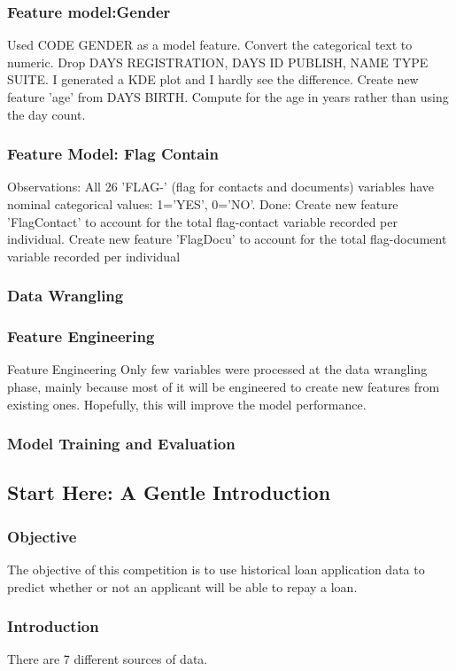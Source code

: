 \documentclass[twoside,a4paper]{article}
\begin{document}
\subsubsection{Feature model:Gender}
Used CODE GENDER as a model feature. Convert the categorical text to numeric.
Drop DAYS REGISTRATION, DAYS ID PUBLISH, NAME TYPE SUITE. I generated a KDE plot and I hardly see the difference.
Create new feature 'age' from DAYS BIRTH. Compute for the age in years rather than using the day count.
\subsubsection{Feature Model: Flag Contain}
Observations:
All 26 'FLAG-' (flag for contacts and documents) variables have nominal categorical values: 1='YES', 0='NO'.
Done:
Create new feature 'FlagContact' to account for the total flag-contact variable recorded per individual.
Create new feature 'FlagDocu' to account for the total flag-document variable recorded per individual
\subsubsection{Data Wrangling}

\subsubsection{Feature Engineering}
Feature Engineering
Only few variables were processed at the data wrangling phase, mainly because most of it will be engineered to create new features from existing ones. Hopefully, this will improve the model performance.

\subsubsection{Model Training and Evaluation}


\subsection{Start Here: A Gentle Introduction}

\subsubsection{Objective}
The objective of this competition is to use historical loan application data to predict whether or not an applicant will be able to repay a loan.
\subsubsection{Introduction}
There are 7 different sources of data. 
\end{document}
